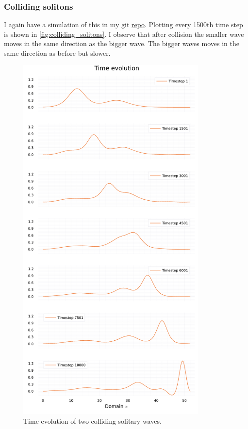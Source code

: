 \documentclass[
	a4paper, %
	10pt, %
]{CSUniSchoolLabReport}
\begin{document}
\subsubsection{Colliding solitons}

I again have a simulation of this in my git \href{https://github.com/simonblaue/MCP-Ex4.git}{repo}. Plotting every 1500th time step is shown in \autoref{fig:colliding_solitons}. I observe that after collision the smaller wave moves in the same direction as the bigger wave. The bigger waves moves in the same direction as before but slower.

\begin{figure}
	\centering
	\includegraphics[width=0.85\textwidth]{../saves_t3/colliding_solitons.pdf}
	\caption{Time evolution of two colliding solitary waves.}
	\label{fig:colliding_solitons}
\end{figure}
\end{document}
